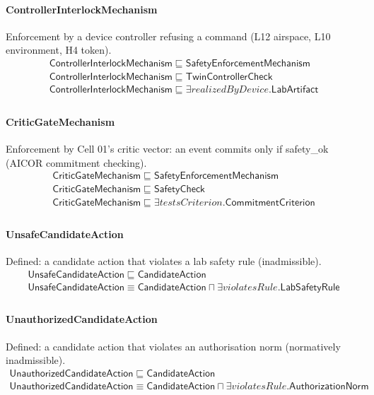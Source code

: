 \documentclass[10pt]{article}
\begin{document}
\paragraph{ControllerInterlockMechanism} Enforcement by a device controller refusing a command (L12 airspace, L10 environment, H4 token).
\[\begin{array}{l}
\mathsf{ControllerInterlockMechanism} \sqsubseteq  \mathsf{SafetyEnforcementMechanism} \\
\mathsf{ControllerInterlockMechanism} \sqsubseteq  \mathsf{TwinControllerCheck} \\
\mathsf{ControllerInterlockMechanism} \sqsubseteq  \exists \mathit{realizedByDevice}.\mathsf{LabArtifact} \\
\end{array}\]
\paragraph{CriticGateMechanism} Enforcement by Cell 01's critic vector: an event commits only if safety\_ok (AICOR commitment checking).
\[\begin{array}{l}
\mathsf{CriticGateMechanism} \sqsubseteq  \mathsf{SafetyEnforcementMechanism} \\
\mathsf{CriticGateMechanism} \sqsubseteq  \mathsf{SafetyCheck} \\
\mathsf{CriticGateMechanism} \sqsubseteq  \exists \mathit{testsCriterion}.\mathsf{CommitmentCriterion} \\
\end{array}\]
\paragraph{UnsafeCandidateAction} Defined: a candidate action that violates a lab safety rule (inadmissible).
\[\begin{array}{l}
\mathsf{UnsafeCandidateAction} \sqsubseteq  \mathsf{CandidateAction} \\
\mathsf{UnsafeCandidateAction} \equiv  \mathsf{CandidateAction} \sqcap  \exists \mathit{violatesRule}.\mathsf{LabSafetyRule} \\
\end{array}\]
\paragraph{UnauthorizedCandidateAction} Defined: a candidate action that violates an authorisation norm (normatively inadmissible).
\[\begin{array}{l}
\mathsf{UnauthorizedCandidateAction} \sqsubseteq  \mathsf{CandidateAction} \\
\mathsf{UnauthorizedCandidateAction} \equiv  \mathsf{CandidateAction} \sqcap  \exists \mathit{violatesRule}.\mathsf{AuthorizationNorm} \\
\end{array}\]
\end{document}
